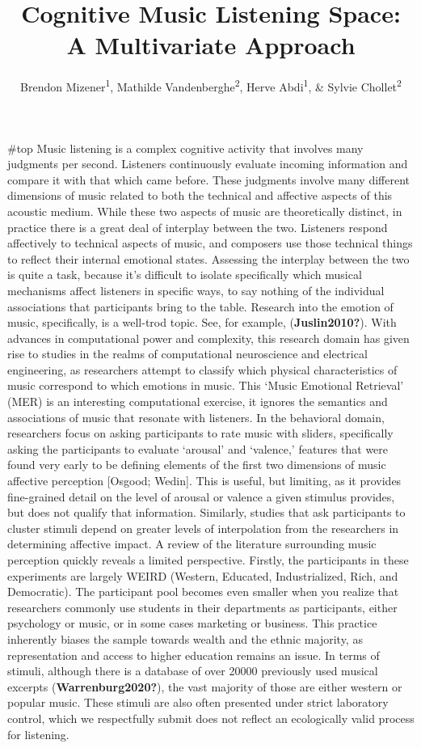 \documentclass[
  english,
  man,floatsintext]{apa6}
\title{Cognitive Music Listening Space: A Multivariate Approach}
\author{Brendon Mizener\textsuperscript{1}, Mathilde Vandenberghe\textsuperscript{2}, Herve Abdi\textsuperscript{1}, \& Sylvie Chollet\textsuperscript{2}}
\date{}
\affiliation{\vspace{0.5cm}\textsuperscript{1} University of Texas at Dallas\\\textsuperscript{2} YNCREA}
\begin{document}
\maketitle

\#top
Music listening is a complex cognitive activity that involves many judgments per second. Listeners continuously evaluate incoming information and compare it with that which came before. These judgments involve many different dimensions of music related to both the technical and affective aspects of this acoustic medium. While these two aspects of music are theoretically distinct, in practice there is a great deal of interplay between the two. Listeners respond affectively to technical aspects of music, and composers use those technical things to reflect their internal emotional states. Assessing the interplay between the two is quite a task, because it's difficult to isolate specifically which musical mechanisms affect listeners in specific ways, to say nothing of the individual associations that participants bring to the table.
Research into the emotion of music, specifically, is a well-trod topic. See, for example, (\textbf{Juslin2010?}). With advances in computational power and complexity, this research domain has given rise to studies in the realms of computational neuroscience and electrical engineering, as researchers attempt to classify which physical characteristics of music correspond to which emotions in music. This `Music Emotional Retrieval' (MER) is an interesting computational exercise, it ignores the semantics and associations of music that resonate with listeners. In the behavioral domain, researchers focus on asking participants to rate music with sliders, specifically asking the participants to evaluate `arousal' and `valence,' features that were found very early to be defining elements of the first two dimensions of music affective perception {[}Osgood; Wedin{]}. This is useful, but limiting, as it provides fine-grained detail on the level of arousal or valence a given stimulus provides, but does not qualify that information. Similarly, studies that ask participants to cluster stimuli depend on greater levels of interpolation from the researchers in determining affective impact.
A review of the literature surrounding music perception quickly reveals a limited perspective. Firstly, the participants in these experiments are largely WEIRD (Western, Educated, Industrialized, Rich, and Democratic). The participant pool becomes even smaller when you realize that researchers commonly use students in their departments as participants, either psychology or music, or in some cases marketing or business. This practice inherently biases the sample towards wealth and the ethnic majority, as representation and access to higher education remains an issue. In terms of stimuli, although there is a database of over 20000 previously used musical excerpts (\textbf{Warrenburg2020?}), the vast majority of those are either western or popular music. These stimuli are also often presented under strict laboratory control, which we respectfully submit does not reflect an ecologically valid process for listening.
\end{document}
